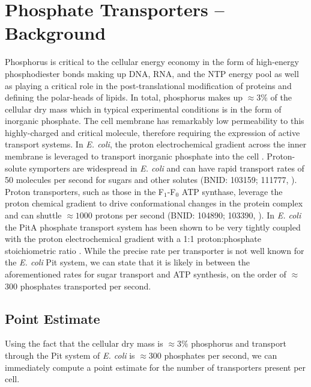 \documentclass[letterpaper, 10pt]{article}
\begin{document}
\section{Phosphate Transporters -- Background}
Phosphorus is critical to the cellular energy economy in the form of
high-energy phosphodiester bonds making up DNA, RNA, and the NTP energy pool
as well as playing a critical role in the post-translational modification of
proteins and defining the polar-heads of lipids. In total, phosphorus makes
up $\approx$3\% of the cellular dry mass which in typical experimental
conditions is in the form of inorganic phosphate. The cell membrane has
remarkably low permeability to this highly-charged and critical molecule,
therefore requiring the expression of active transport systems. In \textit{E. coli}, the proton electrochemical gradient across the inner membrane is
leveraged to transport inorganic phosphate into the cell
\cite{rosenberg1977}. Proton-solute symporters are widespread in \textit{E.
coli} \cite{ramos1977, booth1979} and can have rapid transport rates of 50
molecules per second for sugars and other solutes (BNID: 103159; 111777,
\cite{milo2010}). Proton transporters, such as those in the F$_1$-F$_0$ ATP
synthase, leverage the proton chemical gradient
to drive conformational changes in the protein complex and can shuttle $\approx
1000$ protons per second (BNID: 104890; 103390, \cite{milo2010}). 
In \textit{E. coli} the PitA phosphate transport system has
been shown to be very tightly coupled with the proton electrochemical gradient
with a 1:1 proton:phosphate stoichiometric ratio \cite{harris2001,
feist2007}. While the precise rate per transporter is not well known for the
\textit{E. coli} Pit system, we can state that it is likely in between the
aforementioned rates for sugar transport and ATP synthesis, on the order of
$\approx$ 300 phosphates transported per second. 

\subsection{Point Estimate}
Using the fact that the cellular dry mass is $\approx 3\%$ phosphorus and
transport through the Pit system of \textit{E. coli} is $\approx 300$ phosphates
per second, we can immediately compute a point estimate for the number of
transporters present per cell.
\end{document}
